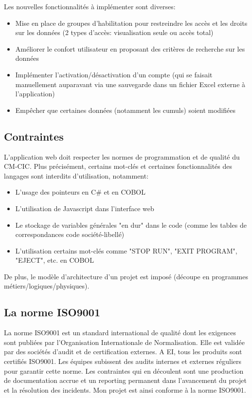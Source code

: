 \documentclass[a4paper,french,12pt]{article}
\begin{document}
		Les nouvelles fonctionnalités à implémenter sont diverses:
		
		\begin{itemize}
			\item Mise en place de groupes d’habilitation pour restreindre les accès et les droits sur les données (2 types d'accès: visualisation seule ou accès total)
			\item Améliorer le confort utilisateur en proposant des critères de recherche sur les données
			\item Implémenter l’activation/désactivation d’un compte (qui se faisait manuellement auparavant via une sauvegarde dans un fichier Excel externe à l'application)
			\item Empêcher que certaines données (notamment les cumuls) soient modifiées
		\end{itemize}
		
	\subsection{Contraintes}
		
		L'application web doit respecter les normes de programmation et de qualité du CM-CIC. Plus précisément, certains mot-clés et certaines fonctionnalités des langages sont interdits d'utilisation,
		notamment:
		
		\begin{itemize}
			\item L'usage des pointeurs en C\# et en COBOL
			\item L'utilisation de Javascript dans l'interface web
			\item Le stockage de variables générales "en dur" dans le code (comme les tables de correspondances code société-libellé)
			\item L'utilisation certains mot-clés comme "STOP RUN", "EXIT PROGRAM", "EJECT", etc. en COBOL
		\end{itemize}
		
		De plus, le modèle d'architecture d'un projet est imposé (découpe en programmes métiers/logiques/physiques).
	
	\subsection{La norme ISO9001}
	
		La norme ISO9001 est un standard international  de qualité dont les exigences sont publiées par l’Organisation Internationale de Normalisation.
		Elle est validée par des sociétés d’audit et de certification externes. 
		A EI, tous les produits sont certifiés ISO9001. Les équipes subissent des audits internes et externes réguliers pour garantir cette norme. 
		Les contraintes qui en découlent sont une production de documentation accrue et un reporting permanent dans l’avancement du projet et la résolution des incidents.
		Mon projet est ainsi conforme à la norme ISO9001.
\end{document}
